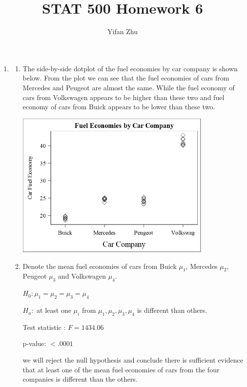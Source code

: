 \documentclass{article}
\begin{document}
	

	
	\title{STAT 500 Homework 6}
	\author{Yifan Zhu}
	\maketitle
	
	\begin{enumerate}[leftmargin = 0 em, label = \arabic*., font = \bfseries]
	\item
	\begin{enumerate}
		\item The side-by-side dotplot of the fuel economies by car company is shown below. From the plot we can see that the fuel economies of cars from Mercedes and Peugeot are almost the same. While the fuel economy of cars from Volkswagen appears to be higher than these two and fuel economy of cars from Buick appears to be lower than these two.

		\begin{center}
		\includegraphics[width = 0.8\textwidth]{dotplot.png}
		\end{center}


		\item Denote the mean fuel economies of cars from Buick $\mu_1$, Mercedes $\mu_2$, Peugeot $\mu_3$ and Volkswagen $\mu_4$.

		$H_0 : \mu_1 = \mu_2 = \mu_3 = \mu_4$

		$H_a :$ at least one $\mu_i$ from $\mu_1, \mu_2, \mu_3, \mu_4$ is different than others.

		Test statistic : $F = 1434.06$

		p-value: $<.0001$

		 we will reject the null hypothesis and conclude there is sufficient evidence that at least one of the mean fuel economies of cars from the four companies is different than the others.


\end{enumerate}
\end{enumerate}
\end{document}
